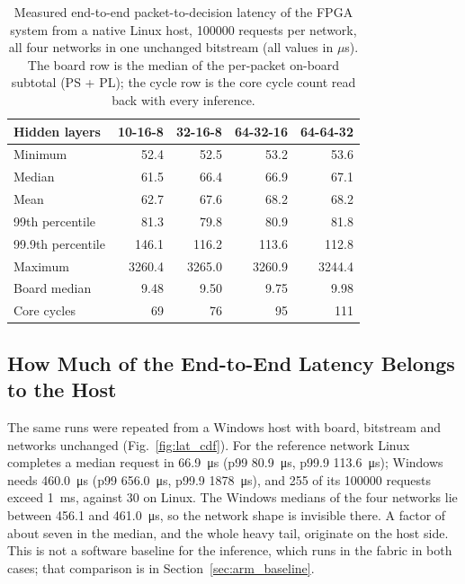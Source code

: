 \documentclass[final,5p,times,twocolumn]{elsarticle}
\begin{document}
\begin{table}[htbp]
\centering
\caption{Measured end-to-end packet-to-decision latency of the FPGA system from
a native Linux host, \num{100000} requests per network, all four networks in one
unchanged bitstream (all values in $\mu$s). The board row is the median of the
per-packet on-board subtotal (PS + PL); the cycle row is the core cycle count
read back with every inference.}
\label{tab:latency_metrics}
\small
\begin{tabular}{@{}lrrrr@{}}
\toprule
Hidden layers & 10-16-8 & 32-16-8 & 64-32-16 & 64-64-32 \\
\midrule
Minimum & 52.4 & 52.5 & 53.2 & 53.6 \\
Median & 61.5 & 66.4 & 66.9 & 67.1 \\
Mean & 62.7 & 67.6 & 68.2 & 68.2 \\
99th percentile & 81.3 & 79.8 & 80.9 & 81.8 \\
99.9th percentile & 146.1 & 116.2 & 113.6 & 112.8 \\
Maximum & 3260.4 & 3265.0 & 3260.9 & 3244.4 \\
\midrule
Board median & 9.48 & 9.50 & 9.75 & 9.98 \\
Core cycles & 69 & 76 & 95 & 111 \\
\bottomrule
\end{tabular}
\end{table}

\subsection{How Much of the End-to-End Latency Belongs to the Host}
\label{sec:osbaseline}
The same runs were repeated from a Windows host with board, bitstream and
networks unchanged (Fig.~\ref{fig:lat_cdf}). For the reference network Linux
completes a median request in \SI{66.9}{\micro\second} (p99
\SI{80.9}{\micro\second}, p99.9 \SI{113.6}{\micro\second}); Windows needs
\SI{460.0}{\micro\second} (p99 \SI{656.0}{\micro\second}, p99.9
\SI{1878}{\micro\second}), and 255 of its \num{100000} requests exceed
\SI{1}{\milli\second}, against 30 on Linux. The Windows medians of the four
networks lie between \SI{456.1}{} and \SI{461.0}{\micro\second}, so the network
shape is invisible there. A factor of about seven in the median, and the whole
heavy tail, originate on the host side. This is not a software baseline for the
inference, which runs in the fabric in both cases; that comparison is in
Section~\ref{sec:arm_baseline}.
\end{document}
